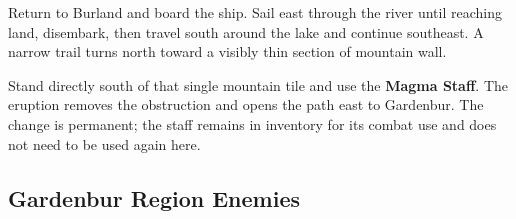\documentclass[
  american,
  10pt,
  letterpaper,
  oneside,
  open=any]{scrreprt}
\newenvironment{guidetable}{%
  \small\setstretch{1.0}%
  \setlength{\tabcolsep}{4pt}%
  \setlength{\LTpre}{8pt}\setlength{\LTpost}{10pt}%
  \renewcommand{\arraystretch}{1.16}%
}{ }
\begin{document}
Return to Burland and board the ship. Sail east through the river until
reaching land, disembark, then travel south around the lake and continue
southeast. A narrow trail turns north toward a visibly thin section of
mountain wall.

Stand directly south of that single mountain tile and use the
\textbf{Magma Staff}. The eruption removes the obstruction and opens the
path east to Gardenbur. The change is permanent; the staff remains in
inventory for its combat use and does not need to be used again here.

\subsection{Gardenbur Region Enemies}\label{gardenbur-region-enemies}

\begin{guidetable}


\end{guidetable}
\end{document}

